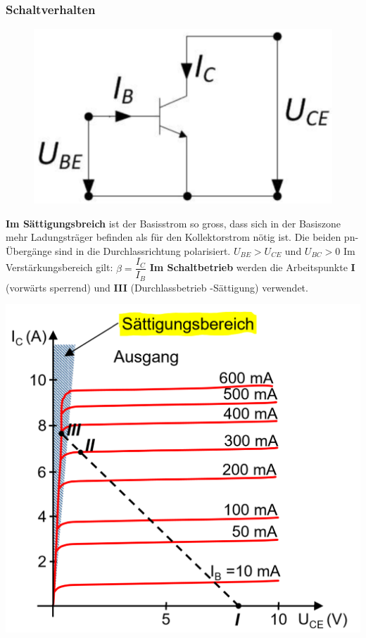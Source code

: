 \subsubsection{Schaltverhalten}
\begin{minipage}{0.6\linewidth}
    \begin{figure}
        \includegraphics[width=\linewidth]{images/npnTransemitter}
    \end{figure}
    \raggedright
    \textbf{Im Sättigungsbreich} ist der Basisstrom so gross, dass sich in der Basiszone mehr Ladungsträger befinden als für den Kollektorstrom nötig ist.\newline\newline
    Die beiden pn-Übergänge sind in die Durchlassrichtung polarisiert.\newline
    $ U_{BE}>U_{CE} $ und $ U_{BC}>0 $\newline\newline
    Im Verstärkungsbereich gilt: $ \beta = \dfrac{I_C}{I_B} $\newline \newline
    \textbf{Im Schaltbetrieb} werden die Arbeitspunkte \textbf{I} (vorwärts sperrend) und \textbf{III} (Durchlassbetrieb -Sättigung) verwendet.
\end{minipage}
\begin{minipage}{0.4\linewidth}
    \includegraphics[width=0.8\linewidth]{images/npnTranskennlinie}
\end{minipage}
